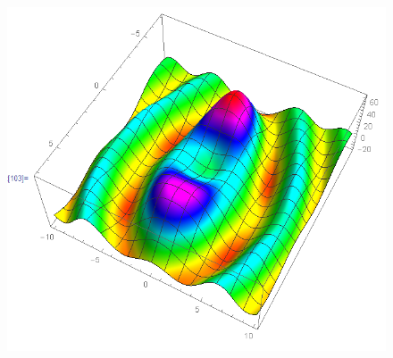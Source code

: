 \documentclass{article}
\theoremstyle{definition}
\begin{document}
\begin{figure}[!htb]
	\includegraphics[scale=0.3]{conv-8}
\end{figure}
\end{document}
